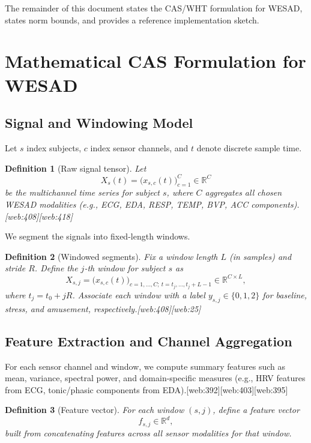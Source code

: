 \documentclass[11pt]{article}
\newtheorem{definition}{Definition}[section]
\newcommand{\R}{\mathbb{R}}
\begin{document}
The remainder of this document states the CAS/WHT formulation for WESAD, states norm bounds, and provides a reference implementation sketch.

\section{Mathematical CAS Formulation for WESAD}

\subsection{Signal and Windowing Model}

Let \(s\) index subjects, \(c\) index sensor channels, and \(t\) denote discrete sample time.

\begin{definition}[Raw signal tensor]
Let
\[
  X_s(t) = \bigl( x_{s,c}(t) \bigr)_{c=1}^{C} \in \R^{C}
\]
be the multichannel time series for subject \(s\), where \(C\) aggregates all chosen WESAD modalities (e.g., ECG, EDA, RESP, TEMP, BVP, ACC components).\cite{Schmidt2018_WESAD,WESAD_CrossDomain}[web:408][web:418]
\end{definition}

We segment the signals into fixed-length windows.

\begin{definition}[Windowed segments]
Fix a window length \(L\) (in samples) and stride \(R\).
Define the \(j\)-th window for subject \(s\) as
\[
  X_{s,j} = \bigl(x_{s,c}(t)\bigr)_{c=1,\dots,C;\ t = t_j,\dots,t_j+L-1}
  \in \R^{C \times L},
\]
where \(t_j = t_0 + jR\).
Associate each window with a label \(y_{s,j} \in \{0,1,2\}\) for baseline, stress, and amusement, respectively.\cite{Schmidt2018_WESAD}[web:408][web:25]
\end{definition}

\subsection{Feature Extraction and Channel Aggregation}

For each sensor channel and window, we compute summary features such as mean, variance, spectral power, and domain-specific measures (e.g., HRV features from ECG, tonic/phasic components from EDA).\cite{WESAD_JohnsonGitHub,WESAD_MMIImplementation,WESAD_Siyixu}[web:392][web:403][web:395]

\begin{definition}[Feature vector]
For each window \((s,j)\), define a feature vector
\[
  f_{s,j} \in \R^d,
\]
built from concatenating features across all sensor modalities for that window.
\end{definition}
\end{document}
